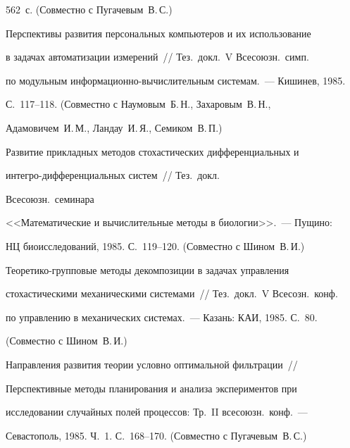 562~с. (Совместно с Пугачевым~В.\,С.)





 Перспективы развития персональных компьютеров и их использование


в задачах автоматизации измерений~// Тез.\ докл.\ V Всесоюзн.\ симп.\


по модульным ин\-фор\-ма\-ци\-он\-но-вы\-чис\-ли\-тель\-ным сис\-те\-мам.~--- Кишинев, 1985.


С.~117--118. (Совместно с Наумовым~Б.\,Н., Захаровым~В.\,Н.,


Адамовичем~И.\,М., Ландау~И.\,Я., Семиком~В.\,П.)





 Развитие прикладных методов стохастических дифференциальных и


интегро-дифференциальных систем~// Тез.\ докл.\linebreak


\vspace*{-12pt}





\pagebreak





\noindent


 Всесоюзн.\ семинара


<<Математические и вычислительные ме\-то\-ды в биологии>>.~--- Пущино:


НЦ биоисследований, 1985. С.~119--120. (Совместно с Шином~В.\,И.)





 Теоретико-групповые методы декомпозиции в задачах управ\-ле\-ния


стохастическими механическими системами~// Тез.\ докл.\ V Всесозн.\ конф.\


по управлению в механических системах.~--- Казань: КАИ, 1985. С.~80.


(Совместно с Шином~В.\,И.)





 Направления развития теории условно оптимальной фильтрации~//


Перспективные методы планирования и анализа экспериментов при


исследовании случайных полей процессов: Тр.\ II всесоюзн.\ конф.~---


Севастополь, 1985. Ч.~1. С.~168--170. (Совместно с Пугачевым~В.\,С.)





